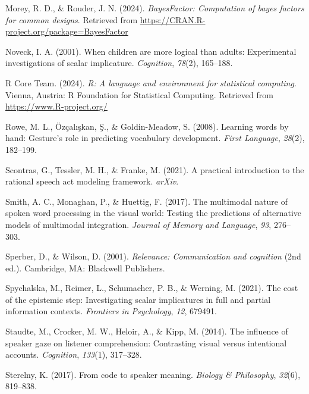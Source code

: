 \documentclass[
  man,floatsintext]{apa6}
\newlength{\cslhangindent}
\newenvironment{CSLReferences}[2] %
 {\begin{list}{}{%
  \setlength{\itemindent}{0pt}
  \setlength{\leftmargin}{0pt}
  \setlength{\parsep}{0pt}
  \ifodd #1
   \setlength{\leftmargin}{\cslhangindent}
   \setlength{\itemindent}{-1\cslhangindent}
  \fi
  \setlength{\itemsep}{#2\baselineskip}}}
 {\end{list}}
\begin{document}
\begin{CSLReferences}{1}{0}
Morey, R. D., \& Rouder, J. N. (2024). \emph{BayesFactor: Computation of bayes factors for common designs}. Retrieved from \url{https://CRAN.R-project.org/package=BayesFactor}

Noveck, I. A. (2001). When children are more logical than adults: Experimental investigations of scalar implicature. \emph{Cognition}, \emph{78}(2), 165--188.

R Core Team. (2024). \emph{R: A language and environment for statistical computing}. Vienna, Austria: R Foundation for Statistical Computing. Retrieved from \url{https://www.R-project.org/}

Rowe, M. L., Özçalışkan, Ş., \& Goldin-Meadow, S. (2008). Learning words by hand: Gesture's role in predicting vocabulary development. \emph{First Language}, \emph{28}(2), 182--199.

Scontras, G., Tessler, M. H., \& Franke, M. (2021). A practical introduction to the rational speech act modeling framework. \emph{arXiv}.

Smith, A. C., Monaghan, P., \& Huettig, F. (2017). The multimodal nature of spoken word processing in the visual world: Testing the predictions of alternative models of multimodal integration. \emph{Journal of Memory and Language}, \emph{93}, 276--303.

Sperber, D., \& Wilson, D. (2001). \emph{Relevance: Communication and cognition} (2nd ed.). Cambridge, MA: Blackwell Publishers.

Spychalska, M., Reimer, L., Schumacher, P. B., \& Werning, M. (2021). The cost of the epistemic step: Investigating scalar implicatures in full and partial information contexts. \emph{Frontiers in Psychology}, \emph{12}, 679491.

Staudte, M., Crocker, M. W., Heloir, A., \& Kipp, M. (2014). The influence of speaker gaze on listener comprehension: Contrasting visual versus intentional accounts. \emph{Cognition}, \emph{133}(1), 317--328.

Sterelny, K. (2017). From code to speaker meaning. \emph{Biology \& Philosophy}, \emph{32}(6), 819--838.


\end{CSLReferences}
\end{document}
